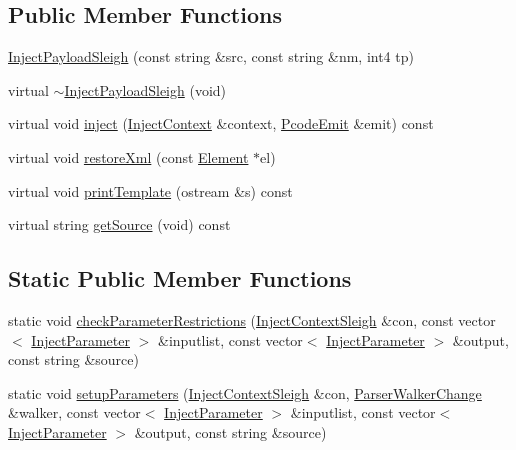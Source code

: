 \subsection*{Public Member Functions}
\begin{DoxyCompactItemize}
\item 
\mbox{\hyperlink{class_inject_payload_sleigh_a33e2114e7eebfa2a130b973fcfa7f549}{Inject\+Payload\+Sleigh}} (const string \&src, const string \&nm, int4 tp)
\item 
virtual \mbox{\hyperlink{class_inject_payload_sleigh_a5efb145e9099025fed51e339a09f3679}{$\sim$\+Inject\+Payload\+Sleigh}} (void)
\item 
virtual void \mbox{\hyperlink{class_inject_payload_sleigh_a54d60a04cf80a0fece97040b0dc8ed0d}{inject}} (\mbox{\hyperlink{class_inject_context}{Inject\+Context}} \&context, \mbox{\hyperlink{class_pcode_emit}{Pcode\+Emit}} \&emit) const
\item 
virtual void \mbox{\hyperlink{class_inject_payload_sleigh_ae41de3f330c3cbb5327e94fcf3ae705c}{restore\+Xml}} (const \mbox{\hyperlink{class_element}{Element}} $\ast$el)
\item 
virtual void \mbox{\hyperlink{class_inject_payload_sleigh_af501310c66ead549c7bd48456b0c8020}{print\+Template}} (ostream \&s) const
\item 
virtual string \mbox{\hyperlink{class_inject_payload_sleigh_a8de1f54277859a5f9b867abaa0387832}{get\+Source}} (void) const
\end{DoxyCompactItemize}
\subsection*{Static Public Member Functions}
\begin{DoxyCompactItemize}
\item 
static void \mbox{\hyperlink{class_inject_payload_sleigh_af694891d58e93134de26968640817371}{check\+Parameter\+Restrictions}} (\mbox{\hyperlink{class_inject_context_sleigh}{Inject\+Context\+Sleigh}} \&con, const vector$<$ \mbox{\hyperlink{class_inject_parameter}{Inject\+Parameter}} $>$ \&inputlist, const vector$<$ \mbox{\hyperlink{class_inject_parameter}{Inject\+Parameter}} $>$ \&output, const string \&source)
\item 
static void \mbox{\hyperlink{class_inject_payload_sleigh_a2e0e17d52688e5404b7133d122b2e8aa}{setup\+Parameters}} (\mbox{\hyperlink{class_inject_context_sleigh}{Inject\+Context\+Sleigh}} \&con, \mbox{\hyperlink{class_parser_walker_change}{Parser\+Walker\+Change}} \&walker, const vector$<$ \mbox{\hyperlink{class_inject_parameter}{Inject\+Parameter}} $>$ \&inputlist, const vector$<$ \mbox{\hyperlink{class_inject_parameter}{Inject\+Parameter}} $>$ \&output, const string \&source)
\end{DoxyCompactItemize}
